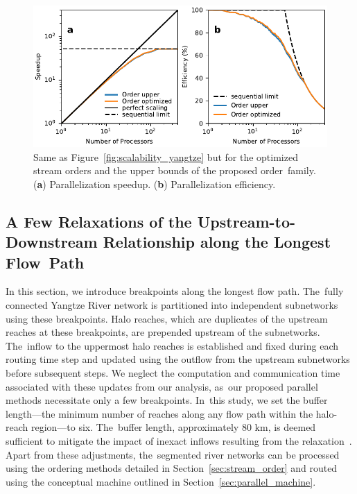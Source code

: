 \documentclass[water,article,accept,pdftex,moreauthors]{Definitions/mdpi}
\begin{document}
\begin{figure}[H]
    \includegraphics[width=12.5 cm]{fig/speedup_opt_yangtze.pdf}
    \caption{Same as Figure~\ref{fig:scalability_yangtze} but for the optimized stream orders and the upper bounds of the proposed order~family. (\textbf{a}) Parallelization speedup. (\textbf{b}) Parallelization efficiency.\label{fig:order_optmization_yangtze}}
\end{figure}
\unskip


\subsection{A Few Relaxations of the Upstream-to-Downstream Relationship along the Longest Flow~Path}
\label{sec:breakdown_yangtze}

In this section, we introduce breakpoints along the longest flow path. The~fully connected Yangtze River network is partitioned into independent subnetworks using these breakpoints. Halo reaches, which are duplicates of the upstream reaches at these breakpoints, are prepended upstream of the subnetworks. The~inflow to the uppermost halo reaches is established and fixed during each routing time step and updated using the outflow from the upstream subnetworks before subsequent steps. We neglect the computation and communication time associated with these updates from our analysis, as~our proposed parallel methods necessitate only a few breakpoints. In~this study, we set the buffer length---the minimum number of reaches along any flow path within the halo-reach region---to six. The~buffer length, approximately 80 km, is deemed sufficient to mitigate the impact of inexact inflows resulting from the relaxation~\cite{david2013WRR}. Apart from these adjustments, the~segmented river networks can be processed using the ordering methods detailed in Section~\ref{sec:stream_order} and routed using the conceptual machine outlined in Section~\ref{sec:parallel_machine}.
\end{document}
